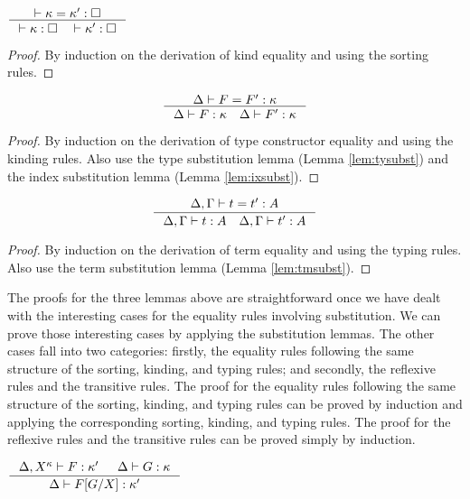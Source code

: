 \begin{lemma}\label{lem:wfeqkind}
$ \inference{|- \kappa = \kappa':\square}
	{|- \kappa:\square \quad |- \kappa':\square} $
\end{lemma}
\begin{proof}
	By induction on the derivation of kind equality
	and using the sorting rules.
\end{proof}

\begin{lemma}\label{lem:wfeqtype}
\[ \inference{\Delta |- F = F':\kappa}
	{\Delta |- F:\kappa \quad \Delta |- F':\kappa}
\]
\end{lemma}
\begin{proof}
	By induction on the derivation of type constructor equality
	and using the kinding rules.
	Also use the type substitution lemma (Lemma \ref{lem:tysubst})
	and the index substitution lemma (Lemma \ref{lem:ixsubst}).
\end{proof}

\begin{lemma}\label{lem:wfeqterm}
\[ \inference{\Delta,\Gamma |- t = t':A}
	{\Delta,\Gamma |- t:A \quad \Delta,\Gamma |- t':A}
\]
\end{lemma}
\begin{proof}
	By induction on the derivation of term equality
	and using the typing rules.
	Also use the term substitution lemma (Lemma \ref{lem:tmsubst}).
\end{proof}

The proofs for the three lemmas above are straightforward
once we have dealt with the interesting cases for the equality rules
involving substitution. We can prove those interesting cases
by applying the substitution lemmas. The other cases fall into two
categories: firstly, the equality rules following the same structure of
the sorting, kinding, and typing rules; and secondly, the reflexive
rules and the transitive rules. The proof for the equality rules
following the same structure of the sorting, kinding, and typing rules
can be proved by induction and applying the corresponding
sorting, kinding, and typing rules. The proof for the reflexive rules
and the transitive rules can be proved simply by induction.

\begin{lemma}\label{lem:tysubst}
$ \inference{\Delta,X^\kappa |- F:\kappa' & \Delta |- G:\kappa}
	{\Delta |- F[G/X]:\kappa'} $
\end{lemma}

